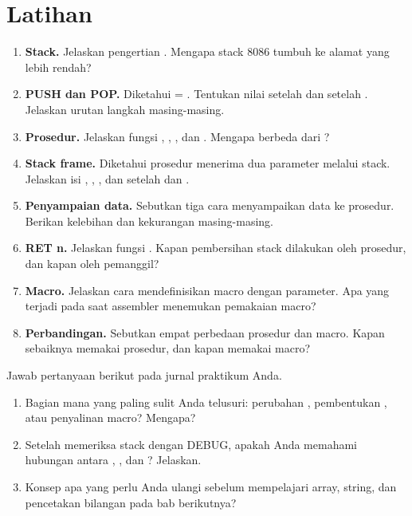 \section{Latihan}
\label{sec:latihan-bab14}

\begin{enumerate}
    \item \textbf{Stack.} Jelaskan pengertian . Mengapa stack 8086 tumbuh ke alamat yang lebih
          rendah?

    \item \textbf{PUSH dan POP.} Diketahui  = .
          Tentukan nilai  setelah  dan setelah
          . Jelaskan urutan langkah masing-masing.

    \item \textbf{Prosedur.} Jelaskan fungsi , ,
          , dan . Mengapa  berbeda dari
          ?

    \item \textbf{Stack frame.} Diketahui prosedur menerima dua
          parameter melalui stack. Jelaskan isi \code{[BP+0]},
          \code{[BP+2]}, \code{[BP+4]}, dan \code{[BP+6]} setelah
           dan .

    \item \textbf{Penyampaian data.} Sebutkan tiga cara menyampaikan
          data ke prosedur. Berikan kelebihan dan kekurangan
          masing-masing.

    \item \textbf{RET n.} Jelaskan fungsi  .
          Kapan pembersihan stack dilakukan oleh prosedur, dan kapan
          oleh pemanggil?

    \item \textbf{Macro.} Jelaskan cara mendefinisikan macro dengan
          parameter. Apa yang terjadi pada saat assembler menemukan
          pemakaian macro?

    \item \textbf{Perbandingan.} Sebutkan empat perbedaan prosedur
          dan macro. Kapan sebaiknya memakai prosedur, dan kapan
          memakai macro?
\end{enumerate}

\begin{refleksibox}
\vspace{1.1em}
Jawab pertanyaan berikut pada jurnal praktikum Anda.
\begin{enumerate}
    \item Bagian mana yang paling sulit Anda telusuri: perubahan
          , pembentukan , atau penyalinan
          macro? Mengapa?
    \item Setelah memeriksa stack dengan DEBUG, apakah Anda memahami
          hubungan antara , , dan ?
          Jelaskan.
    \item Konsep apa yang perlu Anda ulangi sebelum mempelajari
          array, string, dan pencetakan bilangan pada bab berikutnya?
\end{enumerate}
\end{refleksibox}
